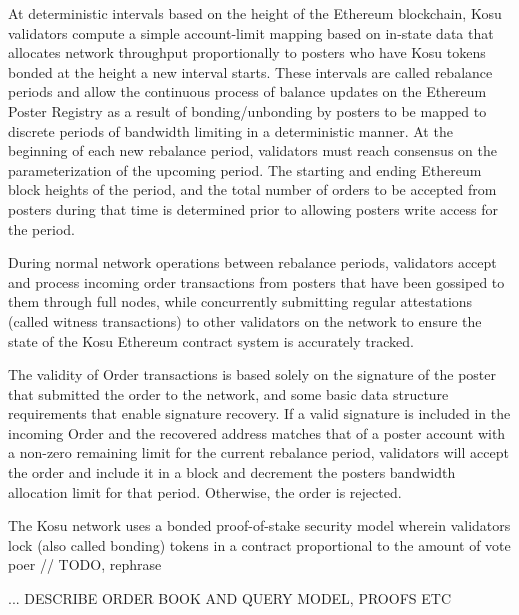 \documentclass[10pt]{article}
\begin{document}
At deterministic intervals based on the height of the Ethereum blockchain, Kosu validators compute a simple account-limit mapping based on in-state data that allocates network throughput proportionally to posters who have Kosu tokens bonded at the height a new interval starts. These intervals are called rebalance periods and allow the continuous process of balance updates on the Ethereum Poster Registry as a result of bonding/unbonding by posters to be mapped to discrete periods of bandwidth limiting in a deterministic manner. At the beginning of each new rebalance period, validators must reach consensus on the parameterization of the upcoming period. The starting and ending Ethereum block heights of the period, and the total number of orders to be accepted from posters during that time is determined prior to allowing posters write access for the period.
\medskip

During normal network operations between rebalance periods, validators accept and process incoming order transactions from posters that have been gossiped to them through full nodes, while concurrently submitting regular attestations (called witness transactions) to other validators on the network to ensure the state of the Kosu Ethereum contract system is accurately tracked.
\medskip

The validity of Order transactions is based solely on the signature of the poster that submitted the order to the network, and some basic data structure 
requirements that enable signature recovery. If a valid signature is included in the incoming Order and the recovered address matches that of a poster account with a non-zero remaining limit for the current rebalance period, validators will accept the order and include it in a block and decrement the posters bandwidth allocation limit for that period. Otherwise, the order is rejected.
\medskip

The Kosu network uses a bonded proof-of-stake security model wherein validators lock (also called bonding) tokens in a contract proportional to the amount of vote poer // TODO, rephrase

... DESCRIBE ORDER BOOK AND QUERY MODEL, PROOFS ETC
\clearpage
\pagebreak


\end{document}
